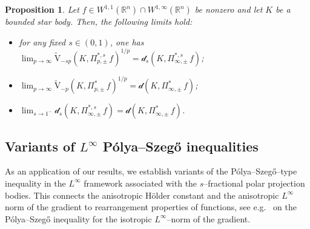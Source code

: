 \documentclass[11pt, reqno]{article}
\newtheorem{proposition}[theorem]{Proposition}
\theoremstyle{definition}
\numberwithin{equation}{section}
\newcommand{\R}{\mathbb{R}}
\newcommand{\vtil}{\widetilde{\mathrm{V}}}
\newcommand{\dila}{\mathscr{d}}
\begin{document}
\begin{proposition}\label{prop.limit.1/p.pm}
    Let $f \in W^{1, 1}(\R^n) \cap W^{1, \infty}(\R^n)$ be nonzero and let  $K$ be a bounded star body.
	Then, the following limits hold: 
	\begin{itemize}
		\item[(i)] for any fixed $s \in (0, 1)$, one has $\textstyle\lim_{p \to \infty} \vtil_{-sp} (K, \Pi^{\ast, s}_{p, \pm} \, f)^{1/p} = \dila_s(K, \Pi^{\ast, s}_{\infty, \pm} \, f)$;
		
		\item[(ii)] $\textstyle\lim_{p \to \infty} \vtil_{-p}(K, \Pi^\ast_{p, \pm} \, f)^{1/p} = \dila(K, \Pi^\ast_{\infty, \pm} \, f)$;
		
		\item[(iii)] $\textstyle\lim_{s \to 1^-} \dila_s(K, \Pi^{\ast, s}_{\infty, \pm} \, f) = \dila(K, \Pi^\ast_{\infty, \pm} \, f)$.
	\end{itemize}
\end{proposition}


\subsection{Variants of $L^\infty$ P\'olya--Szeg\H{o} inequalities} 

As an application of our results, we establish variants of the P\'olya--Szeg\H{o}--type inequality in the $L^\infty$ framework associated with the $s$--fractional polar projection bodies.
This connects the anisotropic H\"older constant and the anisotropic $L^\infty$ norm of the gradient to rearrangement properties of functions, see e.g.~\cite[Corollary 8.2]{BS_2000} on the P\'olya--Szeg\H{o} inequality for the isotropic $L^\infty$--norm of the gradient.
\end{document}
